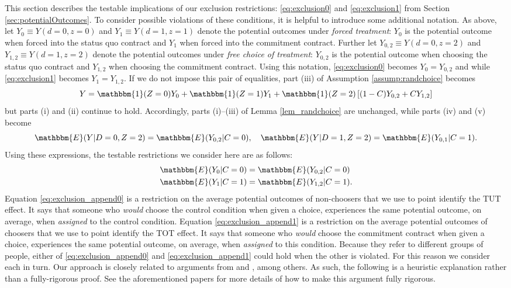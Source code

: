This section describes the testable implications of our exclusion restrictions: \eqref{eq:exclusion0} and \eqref{eq:exclusion1} from Section \ref{sec:potentialOutcomes}. 
To consider possible violations of these conditions, it is helpful to introduce some additional notation.
As above, let $Y_0 \equiv Y(d=0,z=0)$ and $Y_1 \equiv Y(d=1,z=1)$ denote the potential outcomes under \emph{forced treatment}: $Y_0$ is the potential outcome when forced into the status quo contract and $Y_1$ when forced into the commitment contract. 
Further let $Y_{0,2} \equiv Y(d=0,z=2)$ and $Y_{1,2} \equiv Y(d=1,z=2)$ denote the potential outcomes under \emph{free choice of treatment}: $Y_{0,2}$ is the potential outcome when choosing the status quo contract and $Y_{1,2}$ when choosing the commitment contract. 
Using this notation, \eqref{eq:exclusion0} becomes $Y_0 = Y_{0,2}$ and while \eqref{eq:exclusion1} becomes $Y_1 = Y_{1,2}$.
If we do not impose this pair of equalities, part (iii) of Assumption \ref{assump:randchoice} becomes 
\[
Y = \mathbbm{1}(Z =0) Y_{0} + \mathbbm{1}(Z = 1)  Y_{1}  + \mathbbm{1}(Z = 2) \left[(1 - C) Y_{0,2} + C Y_{1,2} \right]
\]
but parts (i) and (ii) continue to hold.
Accordingly, parts (i)--(iii) of Lemma \ref{lem_randchoice} are unchanged, while parts (iv) and (v) become
\[
\mathbbm{E}(Y|D=0,Z=2) = \mathbbm{E}(Y_{0,2}|C=0), \quad
\mathbbm{E}(Y|D=1,Z=2) = \mathbbm{E}(Y_{0,1}|C=1).
\]
Using these expressions, the testable restrictions we consider here are as follows:
\begin{align}
\label{eq:exclusion_append0}
\mathbbm{E}(Y_0|C=0) &= \mathbbm{E}(Y_{0,2}|C=0) \\
\label{eq:exclusion_append1}
\mathbbm{E}(Y_1|C=1) &= \mathbbm{E}(Y_{1,2}|C=1).
\end{align}
Equation \ref{eq:exclusion_append0} is a restriction on the average potential outcomes of non-choosers that we use to point identify the TUT effect.
It says that someone who \emph{would} choose the control condition when given a choice, experiences the same potential outcome, on average, when \emph{assigned} to the control condition.
Equation \ref{eq:exclusion_append1} is a restriction on the average potential outcomes of choosers that we use to point identify the TOT effect.
It says that someone who \emph{would} choose the commitment contract when given a choice, experiences the same potential outcome, on average, when \emph{assigned} to this condition.
Because they refer to different groups of people, either of \eqref{eq:exclusion_append0}  and \eqref{eq:exclusion_append1} could hold when the other is violated.
For this reason we consider each in turn.
Our approach is closely related to arguments from \cite{huber_mellace} and \cite{BinaryRegressor}, among others.
As such, the following is a heuristic explanation rather than a fully-rigorous proof.
See the aforementioned papers for more details of how to make this argument fully rigorous.

